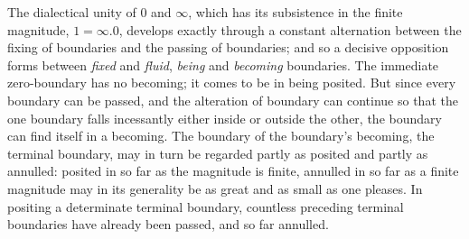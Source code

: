\documentclass[12pt,a4paper]{book}
\begin{document}
The dialectical unity of $0$ and $\infty$, which has its subsistence in the
finite magnitude, $1 = \infty. 0$, develops exactly through a constant
alternation between the fixing of boundaries and the passing of boundaries; and
so a decisive opposition forms between \emph{fixed} and \emph{fluid},
\emph{being} and \emph{becoming} boundaries. The immediate zero-boundary has no
becoming; it comes to be in being posited. But since every boundary can be
passed, and the alteration of boundary can continue so that the one boundary
falls incessantly either inside or outside the other, the boundary can find
itself in a becoming. The boundary of the boundary's becoming, the terminal
boundary, may in turn be regarded partly as posited and partly as annulled:
posited in so far as the magnitude is finite, annulled in so far as a finite
magnitude may in its generality be as great and as small as one pleases. In
positing a determinate terminal boundary, countless preceding terminal
boundaries have already been passed, and so far annulled.
\end{document}
